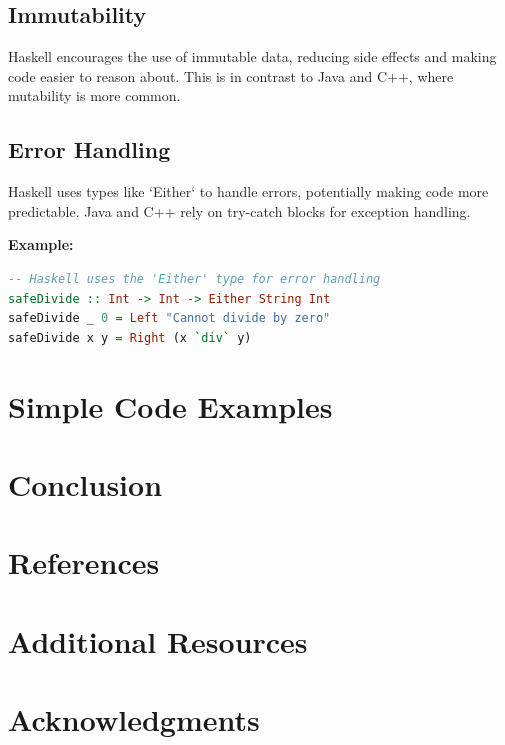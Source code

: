 \documentclass[a4paper, 10pt]{article}
\begin{document}
        \subsection{Immutability}
        Haskell encourages the use of immutable data, reducing side effects and making code easier to reason about. This is in contrast to Java and C++, where mutability is more common.

        \subsection{Error Handling}
        Haskell uses types like `Either` to handle errors, potentially making code more predictable. Java and C++ rely on try-catch blocks for exception handling.

        \textbf{Example:}
        \begin{lstlisting}[language=Haskell]
-- Haskell uses the 'Either' type for error handling
safeDivide :: Int -> Int -> Either String Int
safeDivide _ 0 = Left "Cannot divide by zero"
safeDivide x y = Right (x `div` y)
        \end{lstlisting}
        \newpage
	\section{Simple Code Examples}
	\section{Conclusion}
	\section{References}
	\section{Additional Resources}
	\section{Acknowledgments}
\end{document}
